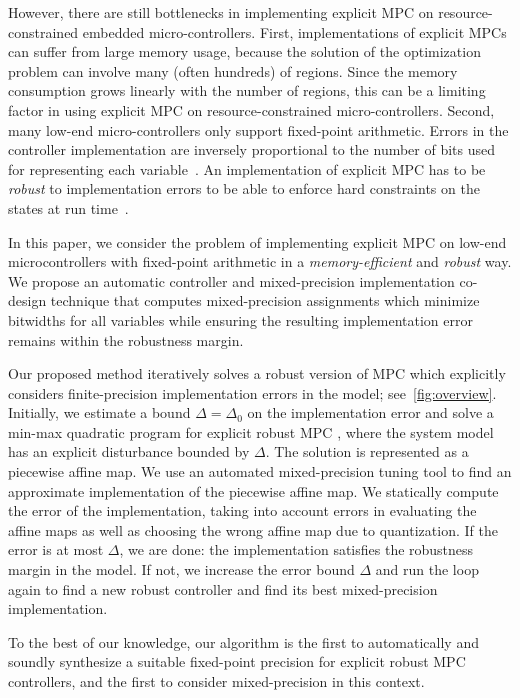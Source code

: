 However, there are still bottlenecks in implementing explicit MPC on resource-constrained embedded micro-controllers.
First, implementations of explicit MPCs can suffer from large memory usage, because the solution of the optimization
problem can involve many (often hundreds) of regions. 
Since the memory consumption grows linearly with the number of regions, 
this can be a limiting factor in using explicit MPC on resource-constrained micro-controllers.
Second, many low-end micro-controllers only support fixed-point arithmetic.
Errors in the controller implementation are inversely proportional to the number of bits used for representing each variable~\cite{Anta10}. 
An implementation of explicit MPC has to be \emph{robust} to 
implementation errors to be able to enforce hard constraints on the states at run time~\cite{imperialrmpc}.

In this paper, we consider the problem of implementing explicit MPC on low-end microcontrollers with fixed-point arithmetic
in a \emph{memory-efficient} and \emph{robust} way.
We propose an automatic controller and mixed-precision implementation co-design
technique that computes mixed-precision assignments which minimize bitwidths for all
variables while ensuring the resulting implementation error remains within the
robustness margin.


Our proposed method iteratively solves a robust version of MPC which explicitly considers finite-precision implementation errors
in the model; see~\autoref{fig:overview}.
Initially, we estimate a bound $\Delta = \Delta_0$ on the implementation error and solve a
min-max quadratic program for explicit robust MPC \cite{delaPea:2005}, where the system
model has an explicit disturbance bounded by $\Delta$.
The solution is represented as a piecewise affine map.
We use an automated mixed-precision tuning tool to find an approximate implementation of the piecewise affine
map. 
We statically compute the error of the implementation, taking into account errors
in evaluating the affine maps as well as choosing the wrong affine map due to quantization.
If the error is at most $\Delta$, we are done: the implementation satisfies the robustness margin in the model.
If not, we increase the error bound $\Delta$ and run the loop again to find a new robust controller and find its best mixed-precision
implementation.

To the best of our knowledge, our algorithm is the first to automatically and soundly
synthesize a suitable fixed-point precision for explicit robust MPC controllers,
and the first to consider mixed-precision in this context.

